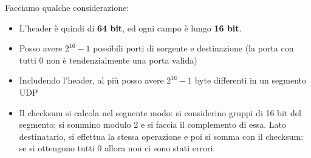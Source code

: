 \documentclass[12pt]{article}
\begin{document}
Facciamo qualche considerazione:
\begin{itemize}
    \item L'header è quindi di \textbf{64 bit}, ed ogni campo è lungo \textbf{16 bit}.
    \item Posso avere $2^{16} - 1$ possibili porti di sorgente e destinazione (la porta con tutti 0 non è tendenzialmente una porta valida)
    \item Includendo l'header, al più posso avere $2^{16} - 1$ byte differenti in un segmento UDP
    \item Il checksum si calcola nel seguente modo: si considerino gruppi di 16 bit del segmento; si sommino modulo 2 e si faccia il complemento di essa.
    Lato destinatario, si effettua la stessa operazione e poi si somma con il checksum: se si ottengono tutti 0 allora non ci sono stati errori.
\end{itemize}
\end{document}
